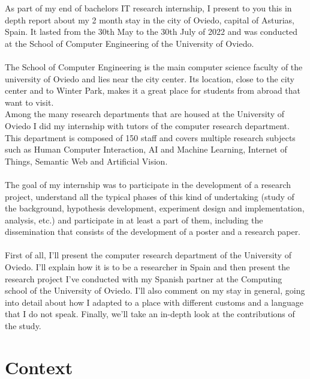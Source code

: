 \documentclass{article}
\begin{document}
 
As part of my end of bachelors IT research internship, I present to you this in depth report about my 2 month stay in the city of Oviedo, capital of Asturias, Spain.
It lasted from the 30th May to the 30th July of 2022 and was conducted at the School of Computer Engineering of the University of Oviedo.
\\\\
The School of Computer Engineering is the main computer science faculty of the university of Oviedo and lies near the city center. Its location, close to the city center and to Winter Park, makes it a great place for students from abroad that want to visit. 
\\
Among the many research departments that are housed at the University of Oviedo I did my internship with tutors of the computer research department. This department is composed of 150 staff and covers multiple research subjects such as Human Computer Interaction, AI and Machine Learning, Internet of Things, Semantic Web and Artificial Vision.
\\\\
The goal of my internship was to participate in the development of a research project, understand all the typical phases of this kind of undertaking (study of the background, hypothesis development, experiment design and implementation, analysis, etc.) and participate in at least a part of them, including the dissemination that consists of the development of a poster and a research paper. 
\\\\
First of all, I’ll present the computer research department of the University of Oviedo. I'll explain how it is to be a researcher in Spain and then present the research project I’ve conducted with my Spanish partner at the Computing school of the University of Oviedo. I’ll also comment on my stay in general, going into detail about how I adapted to a place with different customs and a language that I do not speak.
Finally, we’ll take an in-depth look at the contributions of the study.

\newpage
\section{Context}
\end{document}
